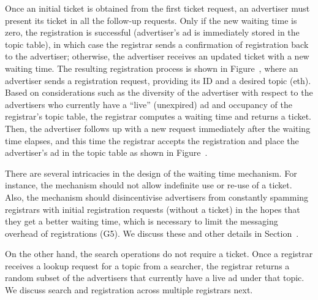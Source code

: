 
Once an initial ticket is obtained from the first ticket request, an advertiser must present its ticket in all the follow-up requests. Only if the new waiting time is zero, the registration is successful (\ie advertiser's ad is immediately stored in the topic table), in which case the registrar sends a confirmation of registration back to the advertiser; otherwise, the advertiser receives an updated ticket with a new waiting time. The resulting registration process is shown in Figure~, where an advertiser sends a registration request, providing its ID and a desired topic (eth). Based on considerations such as the diversity of the advertiser with respect to the advertisers who currently have a ``live'' (\ie unexpired) ad and occupancy of the registrar's topic table, the registrar computes a waiting time and returns a ticket. Then, the advertiser follows up with a new request immediately after the waiting time elapses, and this time the registrar accepts the registration and place the advertiser's ad in the topic table as shown in Figure~.

There are several intricacies in the design of the waiting time mechanism. For instance, the mechanism should not allow indefinite use or re-use of a ticket. Also, the mechanism should disincentivise advertisers from constantly spamming registrars with initial registration requests (without a ticket) in the hopes that they get a better waiting time, which is necessary to limit the messaging overhead of registrations (G5). We discuss these and other details in Section~. 

On the other hand, the search operations do not require a ticket. Once a registrar receives a lookup request for a topic from a searcher, the registrar returns a random subset of the advertisers that currently have a live ad under that topic. We discuss search and registration across multiple registrars next.


